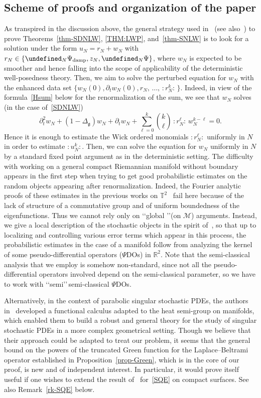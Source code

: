 \documentclass[10pt]{amsart}
\theoremstyle{definition}\newtheorem{defi}[theo]{Definition}\newtheorem{rema}[theo]{Remark}\newtheorem{exam}[theo]{Example}\newtheorem{exem}[theo]{Example}\newtheorem{nota}[theo]{Notation}
\newcommand{\damp}{\textup{damp}}
\newcommand{\R}{\mathbb{R}}
\newcommand{\T}{\mathbb{T}}
\let\P= \undefined
\newcommand{\P}{\mathbf{P}}
\newcommand{\M}{\mathcal{M}}
\newcommand{\g}{\mathfrak{g}}
\newcommand{\Dlg}{\Delta_{\g}}
\newcommand{\dt}{\partial_t}
\begin{document}
\subsection{Scheme of proofs and organization of the paper}
As transpired in the discussion above, the general strategy used in~\cite{DPD} (see also~\cite{McKean,BO96}) to prove Theorems~\ref{thm-SDNLW}, \ref{THM:LWP}, and~\ref{thm-SNLW} is to look for a solution under the form $u_N=r_N+w_N$ with $r_N\in\{\P_N\Psi_{\damp},z_N,\P_N\Psi\}$, where $w_N$ is expected to be smoother and hence falling into the scope of applicability of the deterministic well-posedness theory. Then, we aim to solve the perturbed equation for $w_N$ with the enhanced data set $\{w_N(0),\dt w_N(0),r_N,\,\dots,\,:\!r_N^k\!:\,\}$. Indeed, in view of the formula~\eqref{Hsum} below for the renormalization of the sum, we see that $w_N$ solves (in the case of~\eqref{SDNLW})
\begin{equation}\label{eq-w-r}
\dt^2w_N +(1-\Dlg)w_N +\dt w_N + \sum_{\ell=0}^k{\binom k \ell}\,:\!r_N^{\ell}\!:\,w_N^{k-\ell} = 0.
\end{equation}
Hence it is enough to estimate the Wick ordered monomials $:r_N^{\ell}:$ uniformly in $N$ in order to estimate $:\!u_N^k\!:$. Then, we can solve the equation for $w_N$ uniformly in $N$ by a standard fixed point argument as in the deterministic setting. The difficulty with working on a general compact Riemannian manifold without boundary appears in the first step when trying to get good probabilistic estimates on the random objects appearing after renormalization. Indeed, the Fourier analytic proofs of these estimates in the previous works on $\T^2$~\cite{OT1,OT2,GKO} fail here because of the lack of structure of a commutative group and of uniform boundedness of the eigenfunctions. Thus we cannot rely only on \lq\lq global \rq\rq (on $\M$) arguments. Instead, we give a local description of the stochastic objects in the spirit of~\cite{BGT}, so that up to localizing and controlling various error terms which appear in this process, the probabilistic estimates in the case of a manifold follow from analyzing the kernel of some pseudo-differential operators ($\Psi$DOs) in $\R^2$. Note that the semi-classical analysis that we employ is somehow non-standard, since not all the pseudo-differential operators involved depend on the semi-classical parameter, so we have to work with \lq\lq semi\rq\rq\,semi-classical $\Psi$DOs.

Alternatively, in the context of parabolic singular stochastic PDEs, the authors in~\cite{BB} developed a functional calculus adapted to the heat semi-group on manifolds, which enabled them to build a robust and general theory for the study of singular stochastic PDEs in a more complex geometrical setting. Though we believe that their approach could be adapted to treat our problem, it seems that the general bound on the powers of the truncated Green function for the Laplace--Beltrami operator established in Proposition~\ref{prop-Green}, which is in the core of our proof, is new and of independent interest. In particular, it would prove itself useful if one wishes to extend the result of~\cite{DPD} for~\eqref{SQE} on compact surfaces. See also Remark~\ref{rk-SQE} below.
\end{document}
